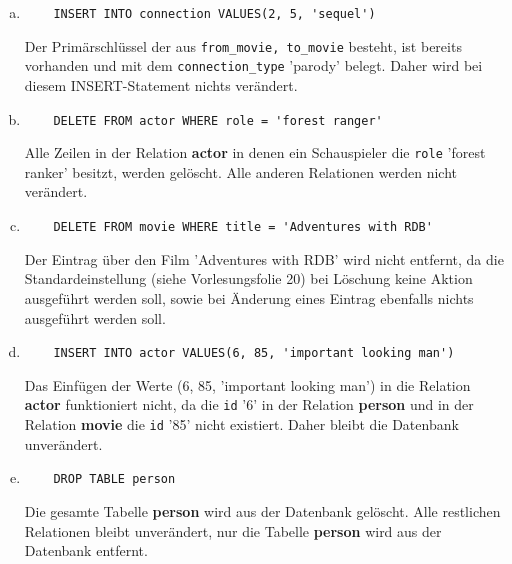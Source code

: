 \documentclass[11pt,a4paper,DIV=9]{scrartcl}
\begin{document}
   \begin{enumerate}[a)]
   \item \begin{lstlisting} 
	INSERT INTO connection VALUES(2, 5, 'sequel') 
   \end{lstlisting} 
   Der Prim\"arschl\"ussel der aus \texttt{from\_movie, to\_movie} besteht, ist bereits vorhanden und mit dem \texttt{connection\_type} 'parody' belegt. Daher wird bei diesem INSERT-Statement nichts ver\"andert.
   
   
   \item \begin{lstlisting} 
	DELETE FROM actor WHERE role = 'forest ranger'
      \end{lstlisting}
      Alle Zeilen in der Relation \textbf{actor} in denen ein Schauspieler die \texttt{role} 'forest ranker' besitzt, werden gel\"oscht. Alle anderen Relationen werden nicht ver\"andert.
   
   

   \item \begin{lstlisting} 
	DELETE FROM movie WHERE title = 'Adventures with RDB'
   \end{lstlisting}
   Der Eintrag \"uber den Film 'Adventures with RDB' wird nicht entfernt, da die Standardeinstellung (siehe Vorlesungsfolie 20) bei L\"oschung keine Aktion ausgef\"uhrt werden soll, sowie bei \"Anderung eines Eintrag ebenfalls nichts ausgef\"uhrt werden soll.
   
   

   \item \begin{lstlisting} 
	INSERT INTO actor VALUES(6, 85, 'important looking man')
   \end{lstlisting}
   Das Einf\"ugen der Werte (6, 85, 'important looking man') in die Relation \textbf{actor} funktioniert nicht, da die \texttt{id} '6' in der Relation \textbf{person} und in der Relation \textbf{movie} die \texttt{id} '85' nicht existiert. Daher bleibt die Datenbank unver\"andert.
   
   

   \item \begin{lstlisting} 
	DROP TABLE person
  \end{lstlisting}
  Die gesamte Tabelle \textbf{person} wird aus der Datenbank gel\"oscht. Alle restlichen Relationen bleibt unver\"andert, nur die Tabelle \textbf{person} wird aus der Datenbank entfernt. 
 

 \end{enumerate}   
\end{document}
